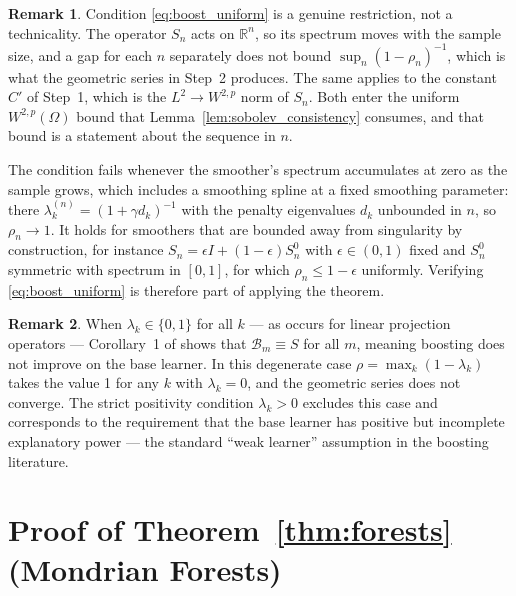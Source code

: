 \documentclass[12pt,a4paper]{article}
\numberwithin{equation}{section}
\theoremstyle{plain}
\theoremstyle{definition}
\newtheorem{remark}{Remark}
\newcommand{\R}{\mathbb{R}}
\newcommand{\Wtwop}{W^{2,p}(\Omega)}
\begin{document}
	\begin{remark}
		\label{rem:uniformity}
		Condition \eqref{eq:boost_uniform} is a genuine restriction, not a
		technicality. The operator $S_n$ acts on $\R^n$, so its spectrum moves
		with the sample size, and a gap for each $n$ separately does not bound
		$\sup_n (1-\rho_n)^{-1}$, which is what the geometric series in Step~2
		produces. The same applies to the constant $C'$ of Step~1, which is the
		$L^2 \to W^{2,p}$ norm of $S_n$. Both enter the uniform $\Wtwop$ bound
		that Lemma~\ref{lem:sobolev_consistency} consumes, and that bound is a
		statement about the sequence in $n$.

		The condition fails whenever the smoother's spectrum accumulates at
		zero as the sample grows, which includes a smoothing spline at a fixed
		smoothing parameter: there $\lambda_k^{(n)} = (1+\gamma d_k)^{-1}$ with
		the penalty eigenvalues $d_k$ unbounded in $n$, so $\rho_n \to 1$. It
		holds for smoothers that are bounded away from singularity by
		construction, for instance $S_n = \epsilon I + (1-\epsilon)S_n^0$ with
		$\epsilon \in (0,1)$ fixed and $S_n^0$ symmetric with spectrum in
		$[0,1]$, for which $\rho_n \leq 1 - \epsilon$ uniformly. Verifying
		\eqref{eq:boost_uniform} is therefore part of applying the theorem.
	\end{remark}

	\begin{remark}
		\label{rem:degenerate}
		When $\lambda_k \in \{0,1\}$ for all $k$ --- as occurs for linear projection
		operators --- Corollary~1 of \citet{buhlmann2003boosting} shows that
		$\mathcal{B}_m \equiv S$ for all $m$, meaning boosting does not improve on the
		base learner. In this degenerate case $\rho = \max_k(1-\lambda_k)$ takes the value
		1 for any $k$ with $\lambda_k = 0$, and the geometric series does not converge.
		The strict positivity condition $\lambda_k > 0$ excludes this case and corresponds
		to the requirement that the base learner has positive but incomplete explanatory
		power --- the standard ``weak learner'' assumption in the boosting literature.
	\end{remark}
	
	\section{Proof of Theorem~\ref{thm:forests} (Mondrian Forests)}
	\label{app:forests}
	
\end{document}
